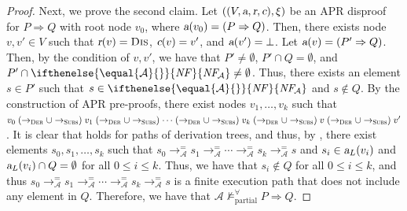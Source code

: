 \documentclass[10pt,a4paper]{article}
\def\cA{\mathcal{A}}
\newcommand{\NF}[1][]{\ifthenelse{\equal{#1}{}}{\mathit{NF}}{\mathit{NF\!}_{#1}}}
\newcommand{\ReachPred}[2]{#1 \Rightarrow #2}
\newcommand{\NotValid}[3]{#2 \mathrel{\mathrel{\not\models^\forall_{\mathrm{#1}}}} #3}
\newcommand{\NotPartiallyValid}[2][\cA]{\NotValid{partial}{#1}{#2}}
\newcommand{\RuleName}[1]{{\rm \textsc{#1}}}
\newcommand{\varsl}[1]{\mbox{\sl #1}}
\newcommand{\Path}[1]{\to_{\mbox{\scriptsize \RuleName{#1}}}}
\newcommand{\toDer}{\Path{Der}}
\newcommand{\toSubs}{\Path{Subs}}
\begin{document}
\begin{proof}
	Next, we prove the second claim.
	Let $((V,\varsl{a},\varsl{r},\varsl{c}),\xi)$ be an APR disproof for $\ReachPred{P}{Q}$ with root node $v_0$,
	where $\varsl{a}(v_0) = (\ReachPred{P}{Q})$.
	Then, there exists node $v,v' \in V$ such that $\varsl{r}(v)=\mbox{\rm\RuleName{Dis}}$, $\varsl{c}(v)=v'$, and $\varsl{a}(v') = \bot$.
	Let $\varsl{a}(v) = (\ReachPred{P'}{Q})$.
	Then, by the condition of $v,v'$, we have that
	$P' \ne \emptyset$, $P' \cap Q = \emptyset$, and $P' \cap \NF[\cA] \ne \emptyset$.
	Thus, there exists an element $s \in P'$ such that $s \in \NF[\cA]$ and $s \notin Q$.
	By the construction of APR pre-proofs, there exist nodes $v_1,\ldots,v_k$ such that
	$v_0 \mathrel{(\toDer \cup \toSubs)}
		v_1 \mathrel{(\toDer \cup \toSubs)}
		\cdots \mathrel{(\toDer \cup \toSubs)}
		v_k \mathrel{(\toDer \cup \toSubs)}
		v \mathrel{(\toDer \cup \toSubs)}
		v'$.
	It is clear that  holds for paths of derivation trees, and thus, by , there exist elements $s_0,s_1,\ldots,s_k$ such that
	$s_0 \mathrel{\to_{\cA}^=}
		s_1 \mathrel{\to_{\cA}^=}
		\cdots \mathrel{\to_{\cA}^=}
		s_k
		\mathrel{\to_{\cA}^=}
		s$
	and
	$s_i \in \varsl{a}_L(v_i)$ and $\varsl{a}_L(v_i) \cap Q = \emptyset$ for all $0 \leq i \leq k$.
	Thus, we have that $s_i \notin Q$ for all $0 \leq i \leq k$, and thus
	$s_0 \mathrel{\to_{\cA}^=}
		s_1 \mathrel{\to_{\cA}^=}
		\cdots \mathrel{\to_{\cA}^=}
		s_k
		\mathrel{\to_{\cA}^=}
		s$
	is a finite execution path that does not include any element in $Q$.
	Therefore,
	we have that $\NotPartiallyValid{\ReachPred{P}{Q}}$.
\end{proof}
\end{document}
